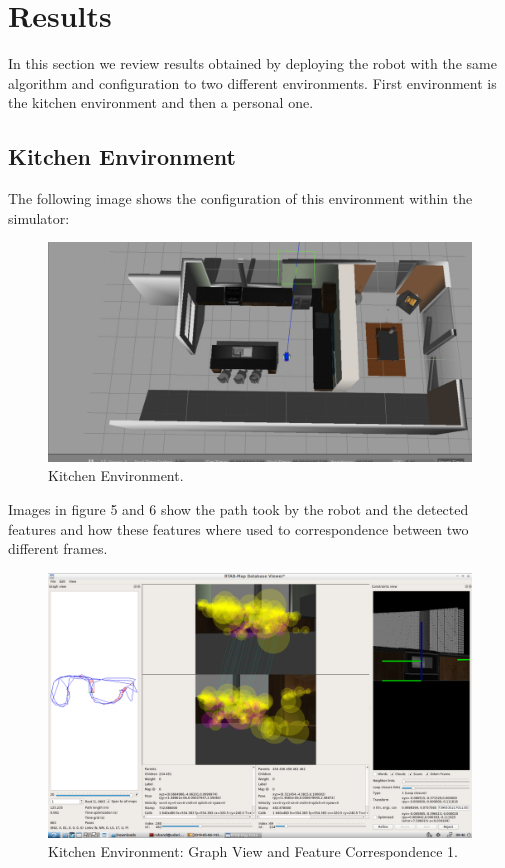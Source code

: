 \documentclass[10pt,journal,compsoc]{IEEEtran}
\begin{document}
\section{Results}

In this section we review results obtained by deploying the robot with the same algorithm and configuration to two different environments. First environment is the kitchen environment and then a personal one.

\subsection{Kitchen Environment}

The following image shows the configuration of this environment within the simulator:

\begin{figure}[thpb]
      \centering
      \includegraphics[width=\linewidth]{kitchen-environment.png}
      \caption{Kitchen Environment.}
      \label{fig:network-training}
\end{figure}

Images in figure 5 and 6 show the path took by the robot and the detected features and how these features where used to correspondence between two different frames.

\begin{figure}[thpb]
      \centering
      \includegraphics[width=\linewidth]{rtab-map-viewer.png}
      \caption{Kitchen Environment: Graph View and Feature Correspondence 1.}
      \label{fig:network-training}
\end{figure}
\end{document}
